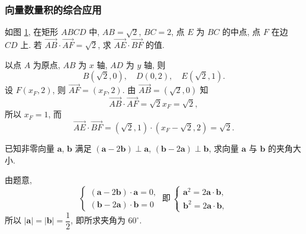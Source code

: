 \subsubsection{向量数量积的综合应用}
\begin{example}
    如图 \ref{fig-190626-1935}, 在矩形 $ABCD$ 中, $AB=\sqrt2$, $BC=2$, 
    点 $E$ 为 $BC$ 的中点, 点 $F$ 在边 $CD$ 上. 
    若 $\overrightarrow{AB}\cdot \overrightarrow{AF}=\sqrt2$,
    求 $\overrightarrow{AE}\cdot \overrightarrow{BF}$ 的值.
\end{example}
\beginsolution
    以点 $A$ 为原点, $AB$ 为 $x$ 轴, $AD$ 为 $y$ 轴, 则
    \[B(\sqrt2,0),\quad D(0,2),\quad E(\sqrt2,1).\]
    设 $F(x_F,2)$, 则 $\overrightarrow{AF}= (x_F,2)$. 由  $\overrightarrow{AB}= (\sqrt2,0)$ 知
    \[\overrightarrow{AB}\cdot \overrightarrow{AF}
        =\sqrt2 x_F= \sqrt2,\]
    所以 $x_F=1$, 而
    \[\overrightarrow{AE}\cdot \overrightarrow{BF}
        = (\sqrt2,1)\cdot (x_F-\sqrt2,2)
        = \sqrt2.\]
\endsolution

    \begin{figure}[htb]
    \small
    \centering
    \caption{}\label{fig-190626-1935}
    \end{figure}
    
\lianxi
\begin{exercise}
    已知非零向量 $\bm{a}$, $\bm{b}$ 满足 $(\bm{a}-2\bm{b})\perp\bm{a}$, $(\bm{b}-2\bm{a})\perp\bm{b}$, 求向量 $\bm{a}$ 与 $\bm{b}$ 的夹角大小.
\end{exercise}
\beginsolution
    由题意,
    \[\left\{\!\!\begin{array}{l}
        (\bm{a}-2\bm{b})\cdot \bm{a}= 0,\\
        (\bm{b}-2\bm{a})\cdot \bm{b}= 0
    \end{array}\right.\ \text{即}\ 
    \left\{\!\!\begin{array}{l}
        \bm{a}^2= 2\bm{a}\cdot\bm{b},\\
        \bm{b}^2= 2\bm{a}\cdot\bm{b},
    \end{array}\right.\]
    所以 $|\bm{a}|= |\bm{b}|= \dfrac12$, 即所求夹角为 $60^\circ$.
\endsolution

